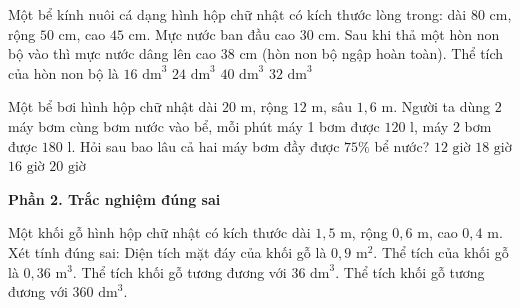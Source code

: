 \begin{ex} %
Một bể kính nuôi cá dạng hình hộp chữ nhật có kích thước lòng trong: dài $80\text{ cm}$, rộng $50\text{ cm}$, cao $45\text{ cm}$. Mực nước ban đầu cao $30\text{ cm}$. Sau khi thả một hòn non bộ vào thì mực nước dâng lên cao $38\text{ cm}$ (hòn non bộ ngập hoàn toàn). Thể tích của hòn non bộ là
\choice
{$16\text{ dm}^3$}
{$24\text{ dm}^3$}
{$40\text{ dm}^3$}
{\True $32\text{ dm}^3$}
\end{ex}

\begin{ex} %
Một bể bơi hình hộp chữ nhật dài $20\text{ m}$, rộng $12\text{ m}$, sâu $1{,}6\text{ m}$. Người ta dùng $2$ máy bơm cùng bơm nước vào bể, mỗi phút máy 1 bơm được $120\text{ l}$, máy 2 bơm được $180\text{ l}$. Hỏi sau bao lâu cả hai máy bơm đầy được $75\%$ bể nước?
\choice
{$12\text{ giờ}$}
{$18\text{ giờ}$}
{\True $16\text{ giờ}$}
{$20\text{ giờ}$}
\end{ex}

\textbf{Phần 2. Trắc nghiệm đúng sai}

\begin{ex} %
Một khối gỗ hình hộp chữ nhật có kích thước dài $1{,}5\text{ m}$, rộng $0{,}6\text{ m}$, cao $0{,}4\text{ m}$. Xét tính đúng sai:
\choiceTF
{\True Diện tích mặt đáy của khối gỗ là $0{,}9\text{ m}^2$.}
{\True Thể tích của khối gỗ là $0{,}36\text{ m}^3$.}
{Thể tích khối gỗ tương đương với $36\text{ dm}^3$.}
{\True Thể tích khối gỗ tương đương với $360\text{ dm}^3$.}
\end{ex}

